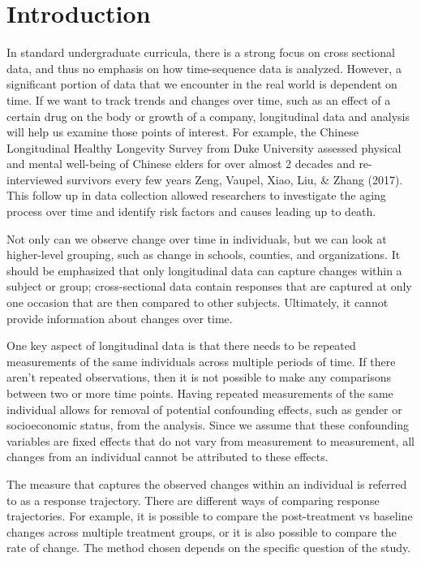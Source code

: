 \documentclass[12pt, twoside]{amherstthesis}
\begin{document}
  \listoffigures


\mainmatter %
\pagestyle{fancyplain} %

\hypertarget{intro}{%
\chapter{Introduction}\label{intro}}

In standard undergraduate curricula, there is a strong focus on cross sectional data, and thus no emphasis on how time-sequence data is analyzed. However, a significant portion of data that we encounter in the real world is dependent on time. If we want to track trends and changes over time, such as an effect of a certain drug on the body or growth of a company, longitudinal data and analysis will help us examine those points of interest. For example, the Chinese Longitudinal Healthy Longevity Survey from Duke University assessed physical and mental well-being of Chinese elders for over almost 2 decades and re-interviewed survivors every few years Zeng, Vaupel, Xiao, Liu, \& Zhang (2017). This follow up in data collection allowed researchers to investigate the aging process over time and identify risk factors and causes leading up to death.

Not only can we observe change over time in individuals, but we can look at higher-level grouping, such as change in schools, counties, and organizations. It should be emphasized that only longitudinal data can capture changes within a subject or group; cross-sectional data contain responses that are captured at only one occasion that are then compared to other subjects. Ultimately, it cannot provide information about changes over time.

One key aspect of longitudinal data is that there needs to be repeated measurements of the same individuals across multiple periods of time. If there aren't repeated observations, then it is not possible to make any comparisons between two or more time points. Having repeated measurements of the same individual allows for removal of potential confounding effects, such as gender or socioeconomic status, from the analysis. Since we assume that these confounding variables are fixed effects that do not vary from measurement to measurement, all changes from an individual cannot be attributed to these effects.

The measure that captures the observed changes within an individual is referred to as a response trajectory. There are different ways of comparing response trajectories. For example, it is possible to compare the post-treatment vs baseline changes across multiple treatment groups, or it is also possible to compare the rate of change. The method chosen depends on the specific question of the study.
\end{document}
